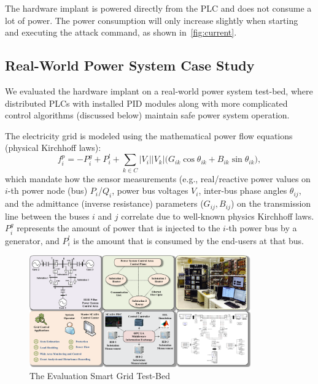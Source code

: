 The hardware implant is powered directly from the PLC and does not consume a lot of power. The power consumption will only increase slightly when starting and executing the attack command, as shown in~\autoref{fig:current}.



\subsection{Real-World Power System Case Study}

We evaluated the hardware implant on a real-world power system test-bed, where distributed PLCs with installed PID modules along with more complicated control algorithms (discussed below) maintain safe power system operation. 

The electricity grid is modeled using the mathematical power flow equations (physical Kirchhoff laws): 
\begin{equation}
\label{eq:powerflowreal}
f_i^p = -P_i^g+P_i^l + \sum_{k \in C}{|V_i||V_k| (G_{ik} \cos{\theta_{ik}} + B_{ik} \sin{\theta_{ik}}}),
\end{equation}
which mandate how the sensor measurements (e.g., real/reactive power values on $i$-th power node (bus) $P_i$/$Q_i$, power bus voltages $V_i$, inter-bus phase angles $\theta_{ij}$, and the admittance (inverse resistance) parameters ($G_{ij}, B_{ij}$) on the transmission line between the buses $i$ and $j$ correlate due to well-known physics Kirchhoff laws. $P_i^g$ represents the amount of power that is injected to the $i$-th power bus by a generator, and $P_i^l$ is the amount that is consumed by the end-users at that bus. 



\begin{figure}[ht]
  \centering
  \includegraphics[width=0.85\textwidth]{figures/testbed2}
  \vspace{-0.0in}
  \caption{The Evaluation Smart Grid Test-Bed}
  \vspace{-0.1in}
  \label{fig:testbed}
\end{figure}





